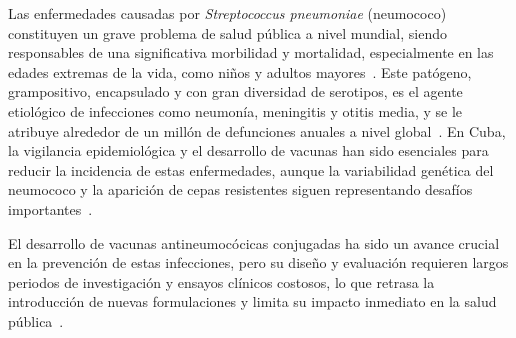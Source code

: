

Las enfermedades causadas por \textit{Streptococcus pneumoniae} (neumococo) constituyen un grave problema de salud pública a nivel mundial, siendo responsables de una significativa morbilidad y mortalidad, especialmente en las edades extremas de la vida, como niños y adultos mayores~\cite{WHO2019}. Este patógeno, grampositivo, encapsulado y con gran diversidad de serotipos, es el agente etiológico de infecciones como neumonía, meningitis y otitis media, y se le atribuye alrededor de un millón de defunciones anuales a nivel global~\cite{OBrien2009}. En Cuba, la vigilancia epidemiológica y el desarrollo de vacunas han sido esenciales para reducir la incidencia de estas enfermedades, aunque la variabilidad genética del neumococo y la aparición de cepas resistentes siguen representando desafíos importantes~\cite{Gonzalez2017}.

El desarrollo de vacunas antineumocócicas conjugadas ha sido un avance crucial en la prevención de estas infecciones, pero su diseño y evaluación requieren largos periodos de investigación y ensayos clínicos costosos, lo que retrasa la introducción de nuevas formulaciones y limita su impacto inmediato en la salud pública~\cite{Plotkin2017}. 

